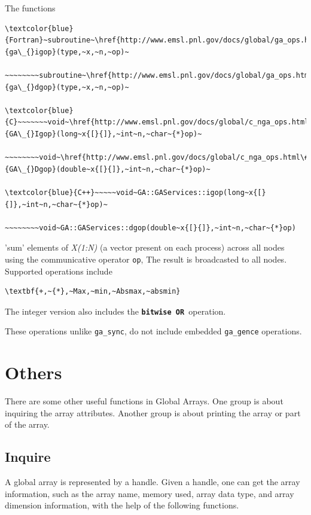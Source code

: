 The functions
\begin{verbatim}
\textcolor{blue}{Fortran}~subroutine~\href{http://www.emsl.pnl.gov/docs/global/ga_ops.html\#ga_igop}{ga\_{}igop}(type,~x,~n,~op)~

~~~~~~~~subroutine~\href{http://www.emsl.pnl.gov/docs/global/ga_ops.html\#ga_igop}{ga\_{}dgop}(type,~x,~n,~op)~

\textcolor{blue}{C}~~~~~~~void~\href{http://www.emsl.pnl.gov/docs/global/c_nga_ops.html\#ga_igop}{GA\_{}Igop}(long~x{[}{]},~int~n,~char~{*}op)~

~~~~~~~~void~\href{http://www.emsl.pnl.gov/docs/global/c_nga_ops.html\#ga_dgop}{GA\_{}Dgop}(double~x{[}{]},~int~n,~char~{*}op)~

\textcolor{blue}{C++}~~~~~void~GA::GAServices::igop(long~x{[}{]},~int~n,~char~{*}op)~

~~~~~~~~void~GA::GAServices::dgop(double~x{[}{]},~int~n,~char~{*}op)
\end{verbatim}
'sum' elements of \emph{X(1:N)} (a vector present on each process)
across all nodes using the communicative operator \texttt{op}, The
result is broadcasted to all nodes. Supported operations include
\begin{verbatim}
\textbf{+,~{*},~Max,~min,~Absmax,~absmin}
\end{verbatim}
The integer version also includes the \texttt{\textbf{bitwise OR }}operation.

These operations unlike \texttt{ga\_sync}, do not include embedded
\texttt{ga\_gence} operations. 


\section{Others }

There are some other useful functions in Global Arrays. One group
is about inquiring the array attributes. Another group is about printing
the array or part of the array. 


\subsection{Inquire }

A global array is represented by a handle. Given a handle, one can
get the array information, such as the array name, memory used, array
data type, and array dimension information, with the help of the following
functions.

